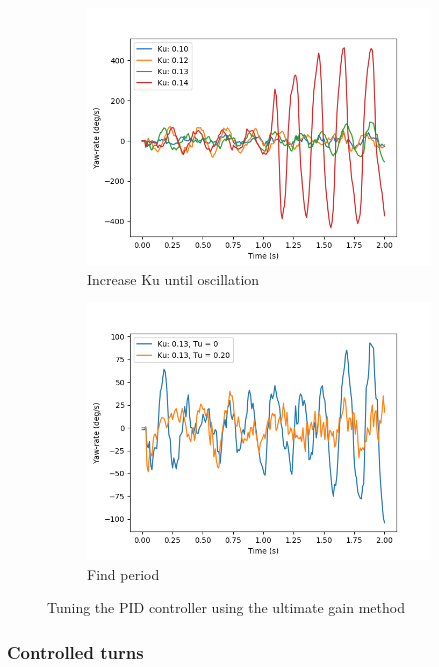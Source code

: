 \begin{figure}[!tbp]
	\begin{subfigure}[b]{0.5\textwidth}
		\includegraphics[width=\textwidth]{pics/straight_ku.png}
		\caption{Increase Ku until oscillation}
		\label{fig:ultimate_gain}
	\end{subfigure}
	\begin{subfigure}[b]{0.5\textwidth}
		\includegraphics[width=\textwidth]{pics/straight_ku_with_tu.png}
		\caption{Find period}
		\label{fig:gain_tuning}
	\end{subfigure}
	\caption{Tuning the PID controller using the ultimate gain method}
\end{figure}

\subsubsection{Controlled turns}


